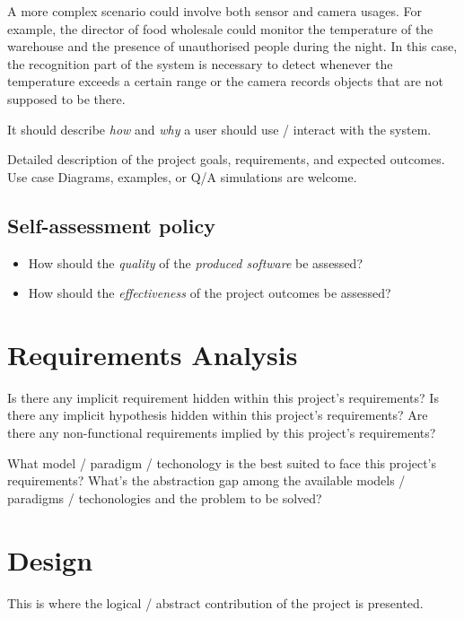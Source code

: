 \documentclass{scrartcl}
\begin{document}
    A more complex scenario could involve both sensor and camera usages.
    For example, the director of food wholesale could monitor the temperature of the warehouse and the presence of
    unauthorised people during the night.
    In this case, the recognition part of the system is necessary to detect whenever the
    temperature exceeds a certain range or the camera records objects that are not supposed to be there.

%
    It should describe \emph{how} and \emph{why} a user should use / interact with the system.


    Detailed description of the project goals, requirements, and expected outcomes.
%
    Use case Diagrams, examples, or Q/A simulations are welcome.

    \subsection{Self-assessment policy}

    \begin{itemize}
        \item How should the \emph{quality} of the \emph{produced software} be assessed?

        \item How should the \emph{effectiveness} of the project outcomes be assessed?
    \end{itemize}


    \section{Requirements Analysis}

    Is there any implicit requirement hidden within this project's requirements?
%
    Is there any implicit hypothesis hidden within this project's requirements?
%
    Are there any non-functional requirements implied by this project's requirements?

    What model / paradigm / techonology is the best suited to face this project's requirements?
%
    What's the abstraction gap among the available models / paradigms / techonologies and the problem to be solved?


    \section{Design}

    This is where the logical / abstract contribution of the project is presented.
\end{document}
